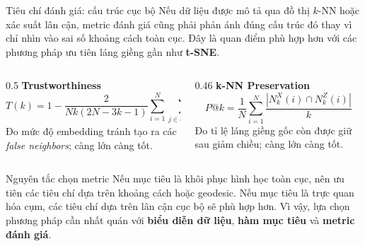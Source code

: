 \begin{frame}[shrink=8]{Tiêu chí đánh giá: cấu trúc cục bộ}
    Nếu dữ liệu được mô tả qua đồ thị $k$-NN hoặc xác suất lân cận, metric đánh giá cũng phải phản ánh đúng cấu trúc đó thay vì chỉ nhìn vào sai số khoảng cách toàn cục. Đây là quan điểm phù hợp hơn với các phương pháp ưu tiên láng giềng gần như \textbf{t-SNE}.

    \vspace{0.18cm}
    \begin{columns}[T]
        \begin{column}{0.5\textwidth}
            {\bfseries Trustworthiness}
            \[
                T(k)=1-\frac{2}{Nk(2N-3k-1)}
                \sum_{i=1}^N\sum_{j\in U_k(i)}(r(i,j)-k)
            \]
            {\small Đo mức độ embedding tránh tạo ra các \textit{false neighbors}; càng lớn càng tốt.}
        \end{column}

        \begin{column}{0.46\textwidth}
            {\bfseries k-NN Preservation}
            \[
                P@k=\frac{1}{N}\sum_{i=1}^{N}\frac{|N_k^X(i)\cap N_k^Z(i)|}{k}
            \]
            {\small Đo tỉ lệ láng giềng gốc còn được giữ sau giảm chiều; càng lớn càng tốt.}
        \end{column}
    \end{columns}

    \vspace{0.18cm}
    \begin{block}{Nguyên tắc chọn metric}
        \small
        Nếu mục tiêu là khôi phục hình học toàn cục, nên ưu tiên các tiêu chí dựa trên khoảng cách hoặc geodesic. Nếu mục tiêu là trực quan hóa cụm, các tiêu chí dựa trên lân cận cục bộ sẽ phù hợp hơn. Vì vậy, lựa chọn phương pháp cần nhất quán với \textbf{biểu diễn dữ liệu}, \textbf{hàm mục tiêu} và \textbf{metric đánh giá}.
    \end{block}
\end{frame}

